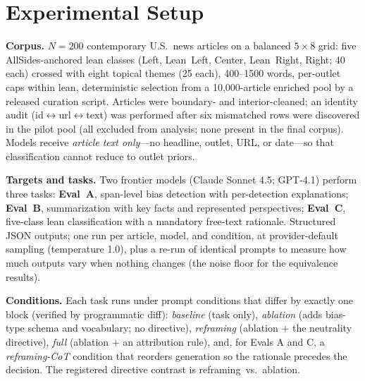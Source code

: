 \documentclass{article}
\begin{document}
\section{Experimental Setup}
\label{sec:setup}

\textbf{Corpus.} $N{=}200$ contemporary U.S.\ news articles on a balanced
$5\times8$ grid: five AllSides-anchored lean classes (Left, Lean~Left,
Center, Lean~Right, Right; 40 each) crossed with eight topical themes
(25 each), 400--1500 words, per-outlet caps within lean, deterministic
selection from a 10{,}000-article enriched pool by a released curation
script. Articles were boundary- and interior-cleaned; an identity audit
(id$\leftrightarrow$url$\leftrightarrow$text) was performed after six
mismatched rows were discovered in the pilot pool (all excluded from
analysis; none present in the final corpus). Models receive
\emph{article text only}---no headline, outlet, URL, or date---so that
classification cannot reduce to outlet priors.

\textbf{Targets and tasks.} Two frontier models (Claude Sonnet 4.5;
GPT-4.1) perform three tasks: \textbf{Eval~A}, span-level bias detection
\citep[task lineage:][]{spinde2021babe,hamborg2019automated}
with per-detection explanations; \textbf{Eval~B}, summarization with key
facts and represented perspectives; \textbf{Eval~C}, five-class lean
classification with a mandatory free-text rationale. Structured JSON
outputs; one run per article, model, and condition, at provider-default sampling (temperature
1.0), plus a re-run of identical prompts to measure how much outputs
vary when nothing changes (the noise floor for the equivalence results).

\textbf{Conditions.} Each task runs under prompt conditions that differ by
exactly one block (verified by programmatic diff): \emph{baseline} (task
only), \emph{ablation} (adds bias-type schema and vocabulary; no
directive), \emph{reframing} (ablation $+$ the neutrality directive),
\emph{full} (ablation $+$ an attribution rule), and, for Evals A and C, a
\emph{reframing-CoT} condition that reorders generation so the rationale precedes
the decision. The registered directive contrast is
reframing~vs.~ablation.
\end{document}
